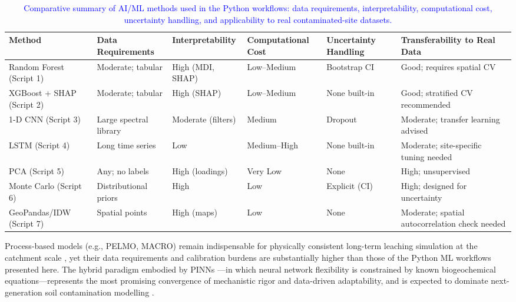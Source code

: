\documentclass[environments,article,submit,pdftex,moreauthors]{Definitions/mdpi}
\begin{document}
\begin{table}[H]
\caption{\textcolor{blue}{Comparative summary of AI/ML methods used in the Python workflows: data requirements, interpretability, computational cost, uncertainty handling, and applicability to real contaminated-site datasets.}\label{tab:method_comparison}}
\begin{tabularx}{\textwidth}{@{} p{2.0cm} p{1.8cm} p{1.5cm} p{1.8cm} p{1.8cm} X @{}}
\toprule
\textbf{Method} & \textbf{Data Requirements} & \textbf{Interpretability} & \textbf{Computational Cost} & \textbf{Uncertainty Handling} & \textbf{Transferability to Real Data} \\
\midrule
Random Forest (Script 1) & Moderate; tabular & High (MDI, SHAP) & Low--Medium & Bootstrap CI & Good; requires spatial CV \\[4pt]
XGBoost + SHAP (Script 2) & Moderate; tabular & High (SHAP) & Low--Medium & None built-in & Good; stratified CV recommended \\[4pt]
1-D CNN (Script 3) & Large spectral library & Moderate (filters) & Medium & Dropout & Moderate; transfer learning advised \\[4pt]
LSTM (Script 4) & Long time series & Low & Medium--High & None built-in & Moderate; site-specific tuning needed \\[4pt]
PCA (Script 5) & Any; no labels & High (loadings) & Very Low & None & High; unsupervised \\[4pt]
Monte Carlo (Script 6) & Distributional priors & High & Low & Explicit (CI) & High; designed for uncertainty \\[4pt]
GeoPandas/IDW (Script 7) & Spatial points & High (maps) & Low & None & Moderate; spatial autocorrelation check needed \\
\bottomrule
\end{tabularx}
\end{table}

Process-based models (e.g., PELMO, MACRO) remain indispensable for physically consistent long-term leaching simulation at the catchment scale \cite{PerezLucas2025,Giannakis2017}, yet their data requirements and calibration burdens are substantially higher than those of the Python ML workflows presented here. The hybrid paradigm embodied by PINNs \cite{Raissi}---in which neural network flexibility is constrained by known biogeochemical equations---represents the most promising convergence of mechanistic rigor and data-driven adaptability, and is expected to dominate next-generation soil contamination modelling \cite{Ma}.
\end{document}
